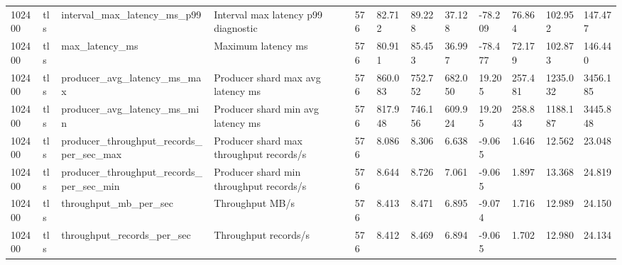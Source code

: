 \begin{longtable}{llllllllllll}
102400 & tls & interval\_max\_latency\_ms\_p99 & Interval max latency p99 diagnostic & 576 & 82.712 & 89.228 & 37.128 & -78.209 & 76.864 & 102.952 & 147.477 \\
102400 & tls & max\_latency\_ms & Maximum latency ms & 576 & 80.911 & 85.453 & 36.997 & -78.477 & 72.179 & 102.873 & 146.440 \\
102400 & tls & producer\_avg\_latency\_ms\_max & Producer shard max avg latency ms & 576 & 860.083 & 752.752 & 682.050 & 19.205 & 257.481 & 1235.032 & 3456.185 \\
102400 & tls & producer\_avg\_latency\_ms\_min & Producer shard min avg latency ms & 576 & 817.948 & 746.156 & 609.924 & 19.205 & 258.843 & 1188.187 & 3445.848 \\
102400 & tls & producer\_throughput\_records\_per\_sec\_max & Producer shard max throughput records/s & 576 & 8.086 & 8.306 & 6.638 & -9.065 & 1.646 & 12.562 & 23.048 \\
102400 & tls & producer\_throughput\_records\_per\_sec\_min & Producer shard min throughput records/s & 576 & 8.644 & 8.726 & 7.061 & -9.065 & 1.897 & 13.368 & 24.819 \\
102400 & tls & throughput\_mb\_per\_sec & Throughput MB/s & 576 & 8.413 & 8.471 & 6.895 & -9.074 & 1.716 & 12.989 & 24.150 \\
102400 & tls & throughput\_records\_per\_sec & Throughput records/s & 576 & 8.412 & 8.469 & 6.894 & -9.065 & 1.702 & 12.980 & 24.134 \\
\hline
\end{longtable}
